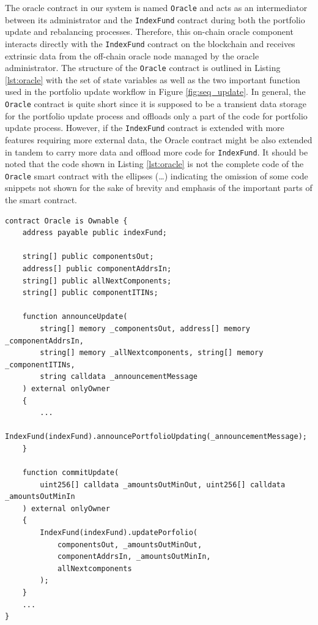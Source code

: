 The oracle contract in our system is named \texttt{Oracle} and acts as an intermediator between its administrator and the \texttt{IndexFund} contract during both the portfolio update and rebalancing processes. Therefore, this on-chain oracle component interacts directly with the \texttt{IndexFund} contract on the blockchain and receives extrinsic data from the off-chain oracle node managed by the oracle administrator. 
The structure of the \texttt{Oracle} contract is outlined in Listing \ref{lst:oracle} with the set of state variables as well as the two important function used in the portfolio update workflow in Figure \ref{fig:seq_update}. In general, the \texttt{Oracle} contract is quite short since it is supposed to be a transient data storage for the portfolio update process and offloads only a part of the code for portfolio update process. However, if the \texttt{IndexFund} contract is extended with more features requiring more external data, the Oracle contract might be also extended in tandem to carry more data and offload more code for \texttt{IndexFund}. It should be noted that the code shown in Listing \ref{lst:oracle} is not the complete code of the \texttt{Oracle} smart contract with the ellipses (\dots) indicating the omission of some code snippets not shown for the sake of brevity and emphasis of the important parts of the smart contract.  

\begin{lstlisting}[language=Solidity, label={lst:oracle}, captionpos=b, caption={Partial Solodity code of the \texttt{Oracle} contract}]
contract Oracle is Ownable {
    address payable public indexFund;

    string[] public componentsOut;
    address[] public componentAddrsIn;
    string[] public allNextComponents;
    string[] public componentITINs;
    
    function announceUpdate(
        string[] memory _componentsOut, address[] memory _componentAddrsIn, 
        string[] memory _allNextcomponents, string[] memory _componentITINs, 
        string calldata _announcementMessage
    ) external onlyOwner 
    {
        ...
        IndexFund(indexFund).announcePortfolioUpdating(_announcementMessage);
    }

    function commitUpdate(
        uint256[] calldata _amountsOutMinOut, uint256[] calldata _amountsOutMinIn
    ) external onlyOwner 
    {
        IndexFund(indexFund).updatePorfolio(
            componentsOut, _amountsOutMinOut, 
            componentAddrsIn, _amountsOutMinIn, 
            allNextcomponents
        );
    }
    ...
}
\end{lstlisting}


